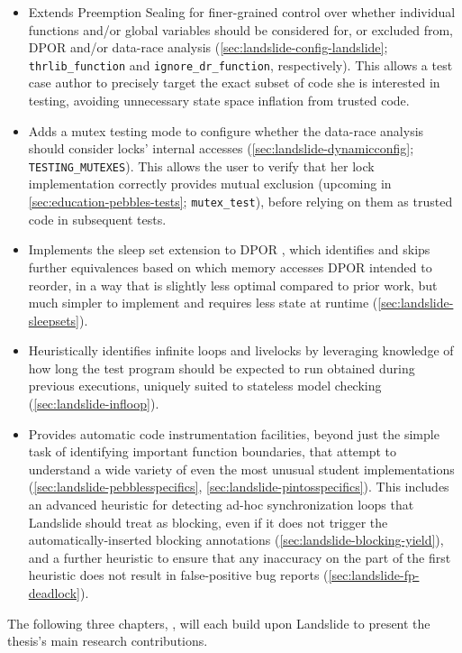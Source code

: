 {\begin{itemize}
	\item Extends Preemption Sealing for finer-grained control
		over whether individual functions and/or global variables
		should be considered for, or excluded from,
		DPOR and/or data-race analysis
		(\cref{sec:landslide-config-landslide};
		{\tt thrlib\_function} and {\tt ignore\_dr\_function}, respectively).
		This allows a test case author to precisely target the exact subset of code
		she is interested in testing,
		avoiding unnecessary state space inflation from trusted code.
	\item Adds a mutex testing mode to configure whether the
		data-race analysis should consider locks' internal accesses
		(\cref{sec:landslide-dynamicconfig}; {\tt TESTING\_MUTEXES}).
		This allows the user to verify that her lock implementation
		correctly provides mutual exclusion
		(upcoming in \cref{sec:education-pebbles-tests}; {\tt mutex\_test}),
		before relying on them as trusted code in subsequent tests.
	\item Implements the sleep set extension to DPOR \cite{partial-order-methods,dpor,optimal-dpor},
		which identifies and skips further equivalences based on which memory accesses
		DPOR intended to reorder,
		in a way that is slightly less optimal compared to prior work,
		but much simpler to implement
		and requires less state at runtime (\cref{sec:landslide-sleepsets}).
	\item Heuristically identifies infinite loops and livelocks
		by leveraging knowledge of how long the test program should be expected to run
		obtained during previous executions,
		uniquely suited to stateless model checking (\cref{sec:landslide-infloop}).
	\item Provides automatic code instrumentation facilities,
		beyond just the simple task of identifying important function boundaries,
		that attempt to understand a wide variety of even the most unusual student implementations
		(\cref{sec:landslide-pebblesspecifics},
		\cref{sec:landslide-pintosspecifics}).
		This includes an advanced heuristic for detecting ad-hoc synchronization loops
		that Landslide should treat as blocking, %
		even if it does not trigger the automatically-inserted blocking annotations
		(\cref{sec:landslide-blocking-yield}),
		and a further heuristic to ensure that any inaccuracy on the part of the first heuristic
		does not result in false-positive bug reports (\cref{sec:landslide-fp-deadlock}).
\end{itemize}

The following three chapters, ,
will each build upon Landslide to present the thesis's main research contributions.}
